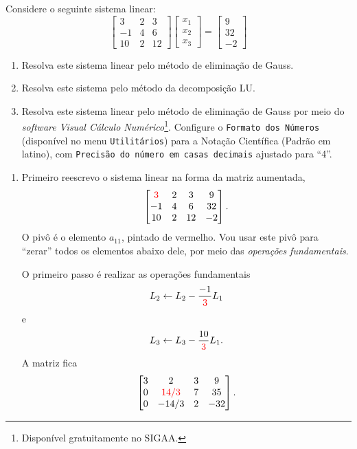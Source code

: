 \begin{ex}\label{sistema}
Considere o seguinte sistema linear:
$$\begin{bmatrix}
3	&2	&3\\
-1	&4	&6\\
10	&2	&12
\end{bmatrix}
\begin{bmatrix}
x_1\\x_2\\x_3
\end{bmatrix}=
\begin{bmatrix}
9\\32\\-2
\end{bmatrix}$$
\begin{enumerate}[label=\alph*)]
\item Resolva este sistema linear pelo método de eliminação de Gauss.\label{gauss}
\item Resolva este sistema pelo método da decomposição LU.
\item Resolva este sistema linear pelo método de eliminação de Gauss por meio do \emph{software Visual Cálculo Numérico}\footnote{Disponível gratuitamente no SIGAA.}. Configure o {\tt Formato dos Números} (disponível no menu {\tt Utilitários}) para a Notação Científica (Padrão em latino), com {\tt Precisão do número em casas decimais} ajustado para ``4''.
\end{enumerate}
\begin{sol}
\begin{enumerate}[label=\alph*)]
\item Primeiro reescrevo o sistema linear na forma da matriz aumentada,
$$\begin{bmatrix}
{\color{red}3}	& 2 & 3 & 9 \\
-1			& 4 & 6	& 32 \\
10			& 2 & 12 & -2 
\end{bmatrix}.$$
O pivô é o elemento $a_{11}$, pintado de vermelho. Vou usar este pivô para ``zerar'' todos os elementos abaixo dele, por meio das \emph{operações fundamentais}.

O primeiro passo é realizar as operações fundamentais $$L_2\leftarrow L_2 - \frac{-1}{{\color{red}3}}L_1$$ e $$L_3\leftarrow L_3 - \frac{10}{{\color{red}3}}L_1.$$ A matriz fica
$$\begin{bmatrix}
3			& 2 & 3 & 9 \\
0			& {\color{red}14/3} & 7	& 35 \\
0			& -14/3 & 2 & -32 
\end{bmatrix}.$$



\end{enumerate}
\end{sol}
\end{ex}
